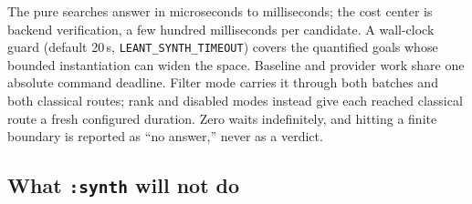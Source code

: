 \documentclass[11pt,oneside]{article}
\newcommand{\code}[1]{\texttt{#1}}
\begin{document}
The pure searches answer in microseconds to milliseconds; the cost
center is backend verification, a few hundred milliseconds per
candidate. A wall-clock guard (default 20\,s,
\code{LEANT\_SYNTH\_TIMEOUT}) covers the quantified goals whose
bounded instantiation can widen the space. Baseline and provider work share one
absolute command deadline. Filter mode carries it through both batches and
both classical routes; rank and disabled modes instead give each reached
classical route a fresh configured duration. Zero waits indefinitely, and
hitting a finite boundary is reported as ``no answer,'' never as a verdict.

\subsection{What \code{:synth} will not do}\label{sec:limits}
\end{document}
